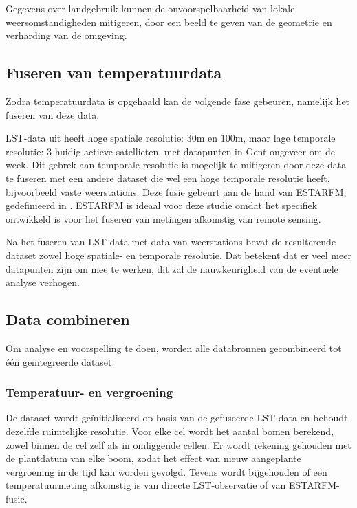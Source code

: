 Gegevens over landgebruik kunnen de onvoorspelbaarheid van lokale weersomstandigheden mitigeren, 
door een beeld te geven van de geometrie en verharding van de omgeving.

\subsection{Fuseren van temperatuurdata}

Zodra temperatuurdata is opgehaald kan de volgende fase gebeuren, namelijk het fuseren van deze data.

LST-data uit \textcite{Parastatidis2017} heeft hoge spatiale resolutie: 30m en 100m, 
maar lage temporale resolutie: 3 huidig actieve satellieten, met datapunten in Gent ongeveer om de week.
Dit gebrek aan temporale resolutie is mogelijk te mitigeren door deze data te fuseren met een andere dataset 
die wel een hoge temporale resolutie heeft, bijvoorbeeld vaste weerstations.
Deze fusie gebeurt aan de hand van ESTARFM, gedefinieerd in \textcite{Zhu2010}.
ESTARFM is ideaal voor deze studie omdat het specifiek ontwikkeld is voor het fuseren van metingen afkomstig van remote sensing.

Na het fuseren van LST data met data van weerstations bevat de resulterende dataset zowel hoge spatiale- en temporale resolutie.
Dat betekent dat er veel meer datapunten zijn om mee te werken, dit zal de nauwkeurigheid van de eventuele analyse verhogen.

\subsection{Data combineren}

Om analyse en voorspelling te doen, worden alle databronnen gecombineerd tot één geïntegreerde dataset.

\subsubsection{Temperatuur- en vergroening}

De dataset wordt geïnitialiseerd op basis van de gefuseerde LST-data en behoudt dezelfde ruimtelijke resolutie. 
Voor elke cel wordt het aantal bomen berekend, zowel binnen de cel zelf als in omliggende cellen.
Er wordt rekening gehouden met de plantdatum van elke boom, 
zodat het effect van nieuw aangeplante vergroening in de tijd kan worden gevolgd. 
Tevens wordt bijgehouden of een temperatuurmeting afkomstig is van directe LST-observatie of van ESTARFM-fusie.

